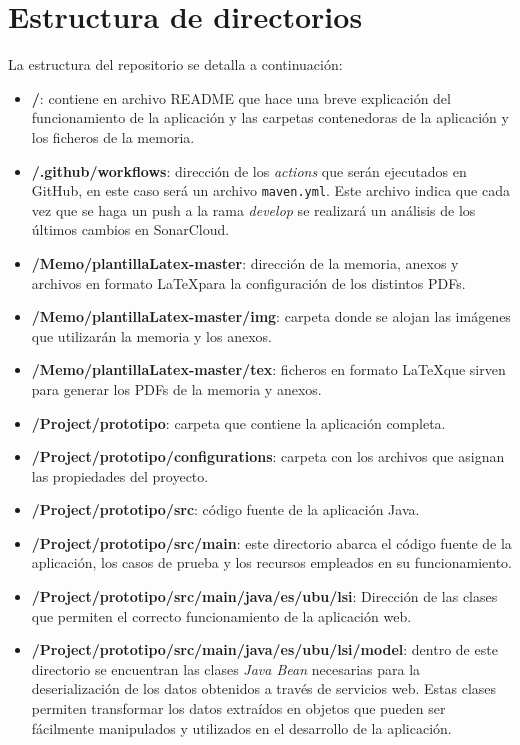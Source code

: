 \section{Estructura de directorios}
La estructura del repositorio se detalla a continuación:
\begin{itemize}
	\item \textbf{/}: contiene en archivo README que hace una breve explicación del funcionamiento de la aplicación y las carpetas contenedoras de la aplicación y los ficheros de la memoria.
	\item \textbf{/.github/workflows}: dirección de los \textit{actions} que serán ejecutados en GitHub, en este caso será un archivo \texttt{maven.yml}. Este archivo indica que cada vez que se haga un push a la rama \textit{develop} se realizará un análisis de los últimos cambios en SonarCloud.
	\item \textbf{/Memo/plantillaLatex-master}: dirección de la memoria, anexos y archivos en formato \LaTeX para la configuración de los distintos PDFs.
	\item \textbf{/Memo/plantillaLatex-master/img}: carpeta donde se alojan las imágenes que utilizarán la memoria y los anexos.
	\item \textbf{/Memo/plantillaLatex-master/tex}: ficheros en formato \LaTeX que sirven para generar los PDFs de la memoria y anexos.
	\item \textbf{/Project/prototipo}: carpeta que contiene la aplicación completa.
	\item \textbf{/Project/prototipo/configurations}: carpeta con los archivos que asignan las propiedades del proyecto.
	\item \textbf{/Project/prototipo/src}: código fuente de la aplicación Java.
	\item \textbf{/Project/prototipo/src/main}: este directorio abarca el código fuente de la aplicación, los casos de prueba y los recursos empleados en su funcionamiento. 
	\item \textbf{/Project/prototipo/src/main/java/es/ubu/lsi}: Dirección de las clases que permiten el correcto funcionamiento de la aplicación web.
	\item \textbf{/Project/prototipo/src/main/java/es/ubu/lsi/model}: dentro de este directorio se encuentran las clases \textit{Java Bean} necesarias para la deserialización de los datos obtenidos a través de servicios web. Estas clases permiten transformar los datos extraídos en objetos que pueden ser fácilmente manipulados y utilizados en el desarrollo de la aplicación.

\end{itemize}
